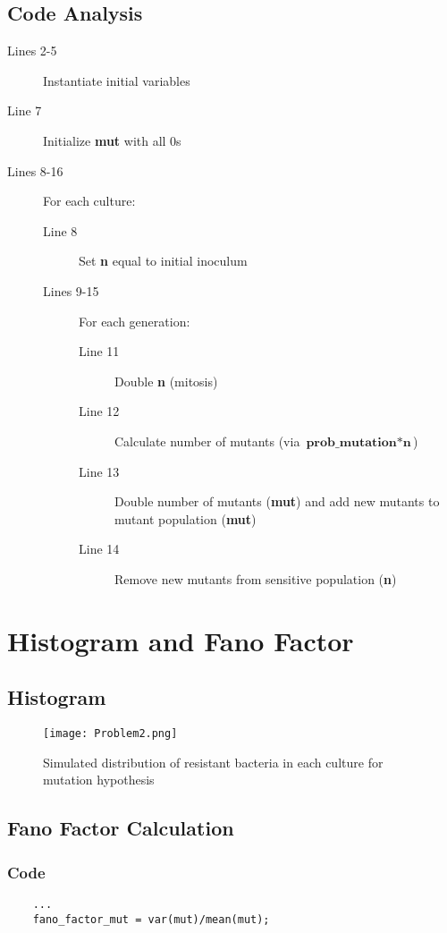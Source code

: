 \documentclass[titlepage]{scrreprt}
\begin{document}
\subsection{Code Analysis}
\begin{description}
    \item[Lines 2-5] Instantiate initial variables
    \item[Line 7] Initialize \textbf{mut} with all 0s
    \item[Lines 8-16] For each culture:
    \begin{description}
        \item[Line 8] Set \textbf{n} equal to initial inoculum
        \item[Lines 9-15] For each generation:
        \begin{description}
            \item[Line 11] Double \textbf{n} (mitosis)
            \item[Line 12] Calculate number of mutants (via $\textbf{prob\_mutation}*\textbf{n}$)
            \item[Line 13] Double number of mutants (\textbf{mut}) and add new mutants to mutant population (\textbf{mut})
            \item[Line 14] Remove new mutants from sensitive population (\textbf{n})
        \end{description}
    \end{description}
\end{description}
\section{Histogram and Fano Factor}
\subsection{Histogram}
\begin{figure}[H]
    \centering
    \texttt{[image: Problem2.png]}
    \caption{Simulated distribution of resistant bacteria in each culture for mutation hypothesis}
    \label{fig:problem2_histogram}
\end{figure}
\subsection{Fano Factor Calculation}
\subsubsection{Code}
\begin{verbatim}
    ...
    fano_factor_mut = var(mut)/mean(mut);    
\end{verbatim}
\end{document}
